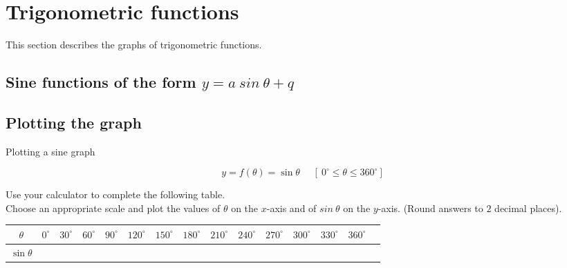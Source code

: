 \section{Trigonometric functions}
This section describes the graphs of trigonometric functions.\par 
{}
\pagebreak %
\subsection{Sine functions of the form $y=a~sin~\theta+q$}
\subsection*{Plotting the graph}
\begin{wex}
{Plotting a sine graph}
{
\begin{equation*}
  y = f(\theta) = \sin\theta~~~~~~[~0^{\circ} \leq \theta \leq 360^{\circ}]
\end{equation*}


Use your calculator to complete the following table. \\
Choose an appropriate scale and plot the values of $\theta $ on the $x$-axis and of $sin~\theta $ on the $y$-axis. (Round answers to $2$ decimal places). 


\begin{table}[H]


\begin{tabular}{|c|m{0.3cm}|m{0.4cm}|m{0.4cm}|m{0.4cm}|m{0.5cm}|m{0.5cm}|m{0.5cm}|m{0.5cm}|m{0.5cm}|m{0.5cm}|m{0.5cm}|m{0.5cm}|m{0.5cm}|} \hline

\footnotesize$\theta $&
\footnotesize$0^{\circ }$&
\footnotesize$30^{\circ }$&
\footnotesize$60^{\circ }$&
\footnotesize$90^{\circ }$&
\footnotesize$120^{\circ }$&
\footnotesize$150^{\circ }$&
\footnotesize$180^{\circ }$&
\footnotesize$210^{\circ }$&
\footnotesize$240^{\circ }$&
\footnotesize$270^{\circ }$&
\footnotesize$300^{\circ }$&
\footnotesize$330^{\circ }$&
\footnotesize$360^{\circ }$
\\ \hline

\footnotesize$\sin\theta$&
&
&
&
&
&
&
&
&
&
&
&
&
&

 \hline
\end{tabular}


\end{table}}
\end{wex}
